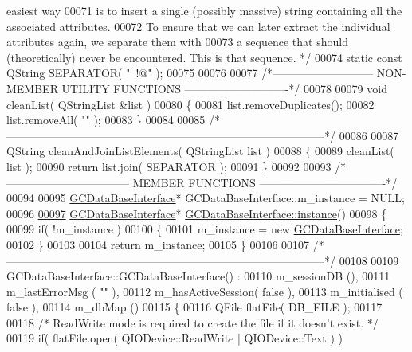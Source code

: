 \begin{DoxyCode}
{       easiest way}
00071 \textcolor{comment}{  is to insert a single (possibly massive) string containing all the associated
       attributes.}
00072 \textcolor{comment}{  To ensure that we can later extract the individual attributes again, we
       separate them with}
00073 \textcolor{comment}{  a sequence that should (theoretically) never be encountered.  This is that
       sequence. */}
00074 \textcolor{keyword}{static} \textcolor{keyword}{const} QString SEPARATOR( \textcolor{stringliteral}{"~!@"} );
00075 
00076 
00077 \textcolor{comment}{/*--------------------------- NON-MEMBER UTILITY FUNCTIONS
       ----------------------------*/}
00078 
00079 \textcolor{keywordtype}{void} cleanList( QStringList &list )
00080 \{
00081   list.removeDuplicates();
00082   list.removeAll( \textcolor{stringliteral}{""} );
00083 \}
00084 
00085 \textcolor{comment}{/*
      --------------------------------------------------------------------------------------*/}
00086 
00087 QString cleanAndJoinListElements( QStringList list )
00088 \{
00089   cleanList( list );
00090   \textcolor{keywordflow}{return} list.join( SEPARATOR );
00091 \}
00092 
00093 \textcolor{comment}{/*--------------------------------- MEMBER FUNCTIONS
       ----------------------------------*/}
00094 
00095 \hyperlink{class_g_c_data_base_interface}{GCDataBaseInterface}* GCDataBaseInterface::m\_instance = NULL;
00096 
\hypertarget{gcdatabaseinterface_8cpp_source_l00097}{}\hyperlink{class_g_c_data_base_interface_a1baea9c0667aa8b610ec30076fcab84c}{00097} \hyperlink{class_g_c_data_base_interface}{GCDataBaseInterface}* \hyperlink{class_g_c_data_base_interface_a1baea9c0667aa8b610ec30076fcab84c}{GCDataBaseInterface::instance}()
00098 \{
00099   \textcolor{keywordflow}{if}( !m\_instance )
00100   \{
00101     m\_instance = \textcolor{keyword}{new} \hyperlink{class_g_c_data_base_interface}{GCDataBaseInterface};
00102   \}
00103 
00104   \textcolor{keywordflow}{return} m\_instance;
00105 \}
00106 
00107 \textcolor{comment}{/*
      --------------------------------------------------------------------------------------*/}
00108 
00109 GCDataBaseInterface::GCDataBaseInterface() :
00110   m\_sessionDB       (),
00111   m\_lastErrorMsg    ( \textcolor{stringliteral}{""} ),
00112   m\_hasActiveSession( false ),
00113   m\_initialised     ( false ),
00114   m\_dbMap           ()
00115 \{
00116   QFile flatFile( DB\_FILE );
00117 
00118   \textcolor{comment}{/* ReadWrite mode is required to create the file if it doesn't exist. */}
00119   \textcolor{keywordflow}{if}( flatFile.open( QIODevice::ReadWrite | QIODevice::Text ) )

\end{DoxyCode}
